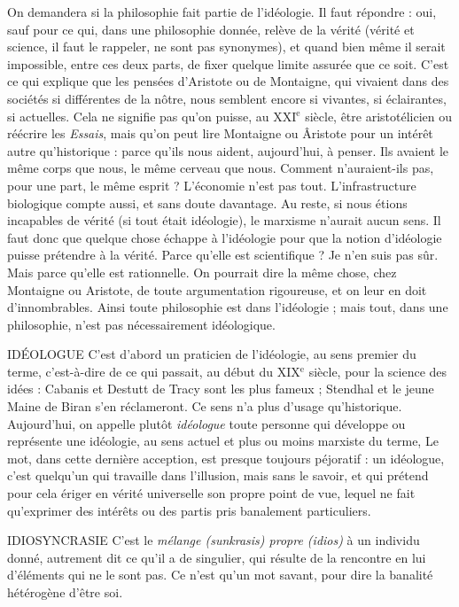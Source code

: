 On demandera si la philosophie fait partie de l'idéologie. Il faut répondre :
oui, sauf pour ce qui, dans une philosophie donnée, relève de la vérité (vérité et
science, il faut le rappeler, ne sont pas synonymes), et quand bien même il
serait impossible, entre ces deux parts, de fixer quelque limite assurée que ce
soit. C’est ce qui explique que les pensées d’Aristote ou de Montaigne, qui
vivaient dans des sociétés si différentes de la nôtre, nous semblent encore si
vivantes, si éclairantes, si actuelles. Cela ne signifie pas qu’on puisse, au
{\footnotesize XXI$^\text{e}$} siècle, être aristotélicien ou réécrire les {\it Essais}, mais qu’on peut lire Montaigne
ou Âristote pour un intérêt autre qu’historique : parce qu'ils nous
aident, aujourd’hui, à penser. Ils avaient le même corps que nous, le même cerveau
que nous. Comment n’auraient-ils pas, pour une part, le même esprit ?
L'économie n’est pas tout. L’infrastructure biologique compte aussi, et sans
doute davantage. Au reste, si nous étions incapables de vérité (si tout était idéologie),
le marxisme n’aurait aucun sens. Il faut donc que quelque chose échappe
à l'idéologie pour que la notion d’idéologie puisse prétendre à la vérité. Parce
qu’elle est scientifique ? Je n’en suis pas sûr. Mais parce qu’elle est rationnelle.
On pourrait dire la même chose, chez Montaigne ou Aristote, de toute argumentation
rigoureuse, et on leur en doit d'innombrables. Ainsi toute philosophie
est dans l'idéologie ; mais tout, dans une philosophie, n’est pas nécessairement
idéologique.

IDÉOLOGUE C'est d’abord un praticien de l’idéologie, au sens premier du
terme, c’est-à-dire de ce qui passait, au début du {\footnotesize XIX$^\text{e}$} siècle,
pour la science des idées : Cabanis et Destutt de Tracy sont les plus fameux ;
Stendhal et le jeune Maine de Biran s’en réclameront. Ce sens n’a plus d’usage
qu’historique. Aujourd’hui, on appelle plutôt {\it idéologue} toute personne qui développe
ou représente une idéologie, au sens actuel et plus ou moins marxiste du
terme, Le mot, dans cette dernière acception, est presque toujours péjoratif : un
idéologue, c’est quelqu'un qui travaille dans l'illusion, mais sans le savoir, et qui
prétend pour cela ériger en vérité universelle son propre point de vue, lequel ne
fait qu’exprimer des intérêts ou des partis pris banalement particuliers.

IDIOSYNCRASIE C’est le {\it mélange (sunkrasis) propre (idios)} à un individu
donné, autrement dit ce qu’il a de singulier, qui résulte
de la rencontre en lui d'éléments qui ne le sont pas. Ce n’est qu’un mot savant,
pour dire la banalité hétérogène d’être soi.

